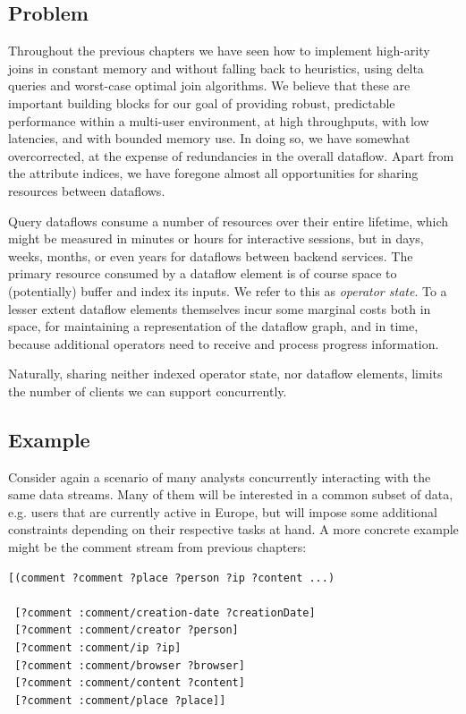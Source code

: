 \documentclass[../catalog.tex]{subfiles}
\begin{document}
\subsection{Problem}

Throughout the previous chapters we have seen how to implement
high-arity joins in constant memory and without falling back to
heuristics, using delta queries and worst-case optimal join
algorithms. We believe that these are important building blocks for
our goal of providing robust, predictable performance within a
multi-user environment, at high throughputs, with low latencies, and
with bounded memory use. In doing so, we have somewhat overcorrected,
at the expense of redundancies in the overall dataflow. Apart from the
attribute indices, we have foregone almost all opportunities for
sharing resources between dataflows.

Query dataflows consume a number of resources over their entire
lifetime, which might be measured in minutes or hours for interactive
sessions, but in days, weeks, months, or even years for dataflows
between backend services. The primary resource consumed by a dataflow
element is of course space to (potentially) buffer and index its
inputs. We refer to this as \emph{operator state}. To a lesser extent
dataflow elements themselves incur some marginal costs both in space,
for maintaining a representation of the dataflow graph, and in time,
because additional operators need to receive and process progress
information.

Naturally, sharing neither indexed operator state, nor dataflow
elements, limits the number of clients we can support concurrently.

\subsection{Example}

Consider again a scenario of many analysts concurrently interacting
with the same data streams. Many of them will be interested in a
common subset of data, e.g. users that are currently active in Europe,
but will impose some additional constraints depending on their
respective tasks at hand. A more concrete example might be the comment
stream from previous chapters:

\begin{verbatim}
[(comment ?comment ?place ?person ?ip ?content ...)

 [?comment :comment/creation-date ?creationDate]
 [?comment :comment/creator ?person]
 [?comment :comment/ip ?ip]
 [?comment :comment/browser ?browser]
 [?comment :comment/content ?content]
 [?comment :comment/place ?place]]
\end{verbatim}
\end{document}
